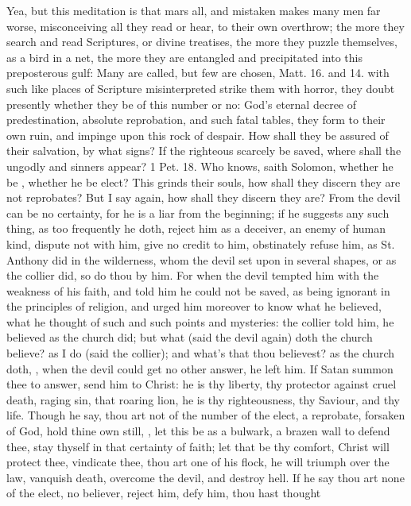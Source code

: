 {Yea, but this meditation is that mars all, and mistaken makes many men
far worse, misconceiving all they read or hear, to their own overthrow;
the more they search and read Scriptures, or divine treatises, the more
they puzzle themselves, as a bird in a net, the more they are entangled
and precipitated into this preposterous gulf: Many are called, but few
are chosen, Matt.  16. and  14. with such like places of
Scripture misinterpreted strike them with horror, they doubt presently
whether they be of this number or no: God's eternal decree of
predestination, absolute reprobation, and such fatal tables, they form
to their own ruin, and impinge upon this rock of despair. How shall
they be assured of their salvation, by what signs? If the righteous
scarcely be saved, where shall the ungodly and sinners appear? 1 Pet.
 18. Who knows, saith Solomon, whether he be , whether he be elect? This grinds
their souls, how shall they discern they are not reprobates? But I say
again, how shall they discern they are? From the devil can be no
certainty, for he is a liar from the beginning; if he suggests any such
thing, as too frequently he doth, reject him as a deceiver, an enemy of
human kind, dispute not with him, give no credit to him, obstinately
refuse him, as St. Anthony did in the wilderness, whom the devil set
upon in several shapes, or as the collier did, so do thou by him. For
when the devil tempted him with the weakness of his faith, and told him
he could not be saved, as being ignorant in the principles of religion,
and urged him moreover to know what he believed, what he thought of
such and such points and mysteries: the collier told him, he believed
as the church did; but what (said the devil again) doth the church
believe? as I do (said the collier); and what's that thou believest? as
the church doth, \etc{}, when the devil could get no other answer, he left
him. If Satan summon thee to answer, send him to Christ: he is thy
liberty, thy protector against cruel death, raging sin, that roaring
lion, he is thy righteousness, thy Saviour, and thy life. Though he
say, thou art not of the number of the elect, a reprobate, forsaken of
God, hold thine own still, , let this be as a
bulwark, a brazen wall to defend thee, stay thyself in that certainty
of faith; let that be thy comfort, Christ will protect thee, vindicate
thee, thou art one of his flock, he will triumph over the law, vanquish
death, overcome the devil, and destroy hell. If he say thou art none of
the elect, no believer, reject him, defy him, thou hast thought
}
